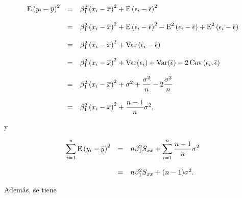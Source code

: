 $$
\begin{array}{rcl}
    \mathop{\mbox{\normalfont E}}\nolimits\left(y_i-\overline{y}\right)^2 &=& \beta_1^2\left(x_i-\overline{x}\right)^2+\mathop{\mbox{\normalfont E}}\nolimits\left(\epsilon_i-\overline{\epsilon}\right)^2\\\\
				      &=& \beta_1^2\left(x_i-\overline{x}\right)^2 + \mathop{\mbox{\normalfont E}}\nolimits\left(\epsilon_i-\overline{\epsilon}\right)^2 - \mathop{\mbox{\normalfont E}}\nolimits^2\left(\epsilon_i-\overline{\epsilon}\right) + \mathop{\mbox{\normalfont E}}\nolimits^2\left(\epsilon_i-\overline{\epsilon}\right)\\\\
				      &=& \beta_1^2\left(x_i-\overline{x}\right)^2 + \mathop{\mbox{\normalfont Var}}\nolimits\left(\epsilon_i-\overline{\epsilon}\right)\\\\
				      &=& \beta_1^2\left(x_i-\overline{x}\right)^2 + \mathop{\mbox{\normalfont Var}}\nolimits(\epsilon_i)+\mathop{\mbox{\normalfont Var}}\nolimits(\overline{\epsilon})-2\mathop{\mbox{\normalfont Cov}}\nolimits\left(\epsilon_i,\overline{\epsilon}\right)\\\\
				      &=& \beta_1^2\left(x_i-\overline{x}\right)^2 + \sigma^2+\dfrac{\sigma^2}{n}-2\dfrac{\sigma^2}{n}\\\\
				      &=& \beta_1^2\left(x_i-\overline{x}\right)^2+\dfrac{n-1}{n}\sigma^2,
\end{array}
$$

y

$$
\begin{array}{rcl}
    \displaystyle\sum_{i=1}^n \mathop{\mbox{\normalfont E}}\nolimits\left(y_i-\overline{y}\right)^2 &=& n\beta_1^2 S_{xx} + \displaystyle\sum_{i=1}^n \dfrac{n-1}{n}\sigma^2\\\\
								&=& n\beta_1^2 S_{xx}+(n-1)\sigma^2.
\end{array}
$$

Además, se tiene

